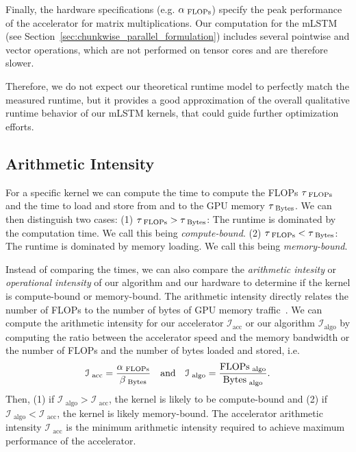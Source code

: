 \documentclass{article}
\begin{document}
    Finally, the hardware specifications (e.g. $\alpha_{\text{ FLOPs}{{}}}$) specify the peak performance of the accelerator for matrix multiplications. 
    Our computation for the mLSTM (see Section~\ref{sec:chunkwise_parallel_formulation}) includes several pointwise and vector operations, which are not performed on tensor cores and are therefore slower.

    Therefore, we do not expect our theoretical runtime model to perfectly match the measured runtime, but it provides a good approximation of the overall qualitative runtime behavior of our mLSTM kernels, that could guide further optimization efforts.

    \vspace{-0.2cm}
    \subsection{Arithmetic Intensity}
    \label{app:arithmetic_intensity_mlstmsig}
    \vspace{-0.15cm}
    For a specific kernel we can compute the time to compute the FLOPs $\tau_{\text{ FLOPs}{{}}}$ and the time to load and store from and to the GPU memory $\tau_{\text{ Bytes}{{}}}$.
    We can then distinguish two cases: (1) $\tau_{\text{ FLOPs}{{}}} > \tau_{\text{ Bytes}{{}}}$: The runtime is dominated by the computation time. We call this being \emph{compute-bound}. (2) $\tau_{\text{ FLOPs}{{}}} < \tau_{\text{ Bytes}{{}}}$: The runtime is dominated by memory loading. We call this being \emph{memory-bound}.

    Instead of comparing the times, we can also compare the \emph{arithmetic intesity} or \emph{operational intensity} of our algorithm and our hardware to determine if the kernel is compute-bound or memory-bound.
    The arithmetic intensity directly relates the number of FLOPs to the number of bytes of GPU memory traffic~\citep{williams:09rooflineanalysis}. 
    We can compute the arithmetic intensity for our accelerator $\mathcal{I}_\text{acc}$ or our algorithm $\mathcal{I}_\text{algo}$ by computing the ratio between the accelerator speed and the memory bandwidth or the number of FLOPs and the number of bytes loaded and stored, i.e.
    \begin{equation}
        \label{eq:arithmetic_intensity}
        \mathcal{I}_\text{ acc} = \frac{\alpha_{\text{ FLOPs}{{}}}}{\beta_{\text{ Bytes}{{}}}} \quad \text{and} \quad \mathcal{I}_\text{ algo} = \frac{\text{FLOPs}_\text{ algo}}{\text{Bytes}_\text{ algo}}.
    \end{equation}
    Then, (1) if $\mathcal{I}_\text{ algo} > \mathcal{I}_\text{ acc}$, the kernel is likely to be compute-bound and (2) if $\mathcal{I}_\text{ algo} < \mathcal{I}_\text{ acc}$, the kernel is likely memory-bound.
    The accelerator arithmetic intensity $\mathcal{I}_\text{ acc}$ is the minimum arithmetic intensity required to achieve maximum performance of the accelerator.
\end{document}
